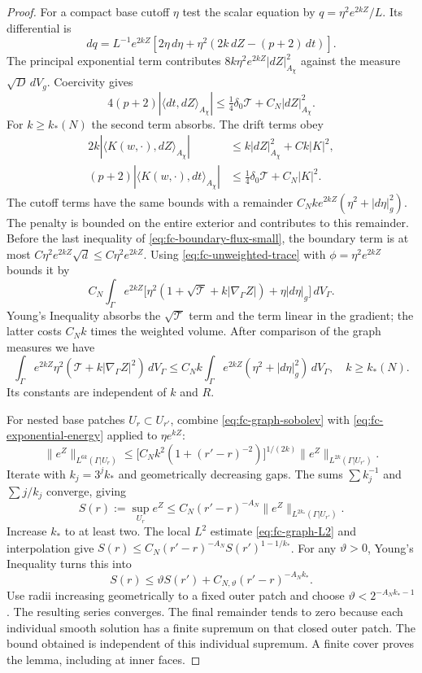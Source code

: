 \begin{proof}
For a compact base cutoff $\eta$ test the scalar equation by
$q=\eta^2e^{2kZ}/L$.  Its differential is
\[
 dq=L^{-1}e^{2kZ}
       [2\eta\,d\eta+\eta^2(2k\,dZ-(p+2)\,dt)].
\]
The principal exponential term contributes
$8k\eta^2e^{2kZ}|dZ|_{A_\chi}^2$ against the measure
$\sqrt D\,dV_g$.  Coercivity gives
\[
 4(p+2)|\langle dt,dZ\rangle_{A_\chi}|
       \le\tfrac14\delta_0\mathcal T+C_N|dZ|_{A_\chi}^2.
\]
For $k\ge k_*(N)$ the second term absorbs.  The drift terms obey
\begin{align*}
 2k|\langle K(w,\cdot),dZ\rangle_{A_\chi}|
      &\le k|dZ|_{A_\chi}^2+Ck|K|^2,\\
 (p+2)|\langle K(w,\cdot),dt\rangle_{A_\chi}|
      &\le\tfrac14\delta_0\mathcal T+C_N|K|^2.
\end{align*}
The cutoff terms have the same bounds with a remainder
$C_Nk e^{2kZ}(\eta^2+|d\eta|_g^2)$.  The penalty is bounded on
the entire exterior and contributes to this remainder.
Before the last inequality of
\eqref{eq:fc-boundary-flux-small}, the boundary term is at most
$C\eta^2e^{2kZ}\sqrt d\le C\eta^2e^{2kZ}$.
Using \eqref{eq:fc-unweighted-trace} with
$\phi=\eta^2e^{2kZ}$ bounds it by
\[
 C_N\int_\Gamma e^{2kZ}
  \bigl[\eta^2(1+\sqrt{\mathcal T}+k|\nabla_\Gamma Z|)
                                  +\eta|d\eta|_g\bigr]\,dV_\Gamma.
\]
Young's Inequality absorbs the $\sqrt{\mathcal T}$ term and the
term linear in the gradient; the latter costs $C_Nk$ times the
weighted volume.  After comparison of the graph measures we have
\begin{equation}\label{eq:fc-exponential-energy}
 \int_\Gamma e^{2kZ}\eta^2
               (\mathcal T+k|\nabla_\Gamma Z|^2)\,dV_\Gamma
 \le C_N k\int_\Gamma e^{2kZ}
                    (\eta^2+|d\eta|_g^2)\,dV_\Gamma,
 \quad k\ge k_*(N).
\end{equation}
Its constants are independent of $k$ and $R$.

For nested base patches $U_r\subset U_{r'}$, combine
\eqref{eq:fc-graph-sobolev} with
\eqref{eq:fc-exponential-energy} applied to $\eta e^{kZ}$:
\[
 \|e^Z\|_{L^{6k}(\Gamma|U_r)}
 \le\bigl[C_Nk^2(1+(r'-r)^{-2})\bigr]^{1/(2k)}
                \|e^Z\|_{L^{2k}(\Gamma|U_{r'})}.
\]
Iterate with $k_j=3^j k_*$ and geometrically decreasing gaps.
The sums $\sum k_j^{-1}$ and $\sum j/k_j$ converge, giving
\[
 S(r):=\sup_{U_r}e^Z
 \le C_N(r'-r)^{-A_N}
                 \|e^Z\|_{L^{2k_*}(\Gamma|U_{r'})}.
\]
Increase $k_*$ to at least two.  The local $L^2$ estimate
\eqref{eq:fc-graph-L2} and interpolation give
$S(r)\le C_N(r'-r)^{-A_N}S(r')^{1-1/k_*}$.
For any $\vartheta>0$, Young's Inequality turns this into
\[
 S(r)\le\vartheta S(r')+
                    C_{N,\vartheta}(r'-r)^{-A_Nk_*}.
\]
Use radii increasing geometrically to a fixed outer patch and
choose $\vartheta<2^{-A_Nk_*-1}$.  The resulting series converges.
The final remainder tends to zero because each individual smooth
solution has a finite supremum on that closed outer patch.  The
bound obtained is independent of this individual supremum.
A finite cover proves the lemma, including at inner faces.
\end{proof}

